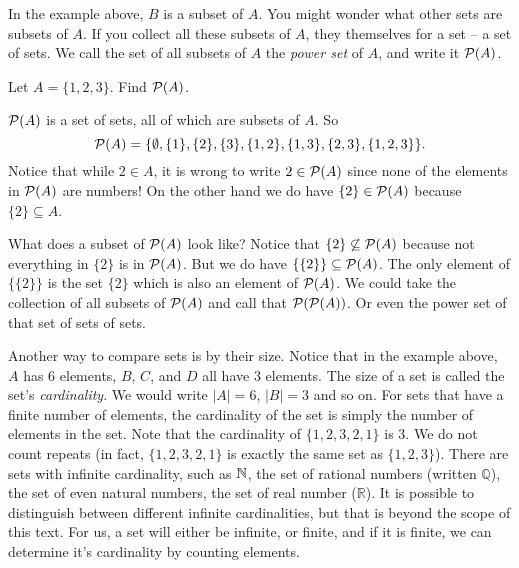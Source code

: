 \documentclass[12pt]{article}
\begin{document}
In the example above, $B$ is a subset of $A$.  You might wonder what other sets are subsets of $A$.  If you collect all these subsets of $A$, they themselves for a set -- a set of sets.  We call the set of all subsets of $A$ the \emph{power set} of $A$, and write it $\mathcal P(A)$.

\begin{example}
  Let $A = \{1,2,3\}$.  Find $\mathcal P(A)$.
  \begin{solution}
    $\mathcal P(A)$ is a set of sets, all of which are subsets of $A$.  So
    \[\mathcal P(A) = \{ \emptyset, \{1\}, \{2\}, \{3\}, \{1,2\}, \{1, 3\}, \{2,3\}, \{1,2,3\}\}.\]
    Notice that while $2 \in A$, it is wrong to write $2 \in \mathcal P(A)$ since none of the elements in $\mathcal P(A)$ are numbers!  On the other hand we do have $\{2\} \in \mathcal P(A)$ because $\{2\} \subseteq A$.

    What does a subset of $\mathcal P(A)$ look like?  Notice that $\{2\} \not\subseteq \mathcal P(A)$ because not everything in $\{2\}$ is in $\mathcal P(A)$.  But we do have $\{ \{2\} \} \subseteq \mathcal P(A)$.  The only element of $\{\{2\}\}$ is the set $\{2\}$ which is also an element of $\mathcal P(A)$.  We could take the collection of all subsets of $\mathcal P(A)$ and call that $\mathcal P(\mathcal P(A))$.  Or even the power set of that set of sets of sets.
  \end{solution}

\end{example}


Another way to compare sets is by their size.  Notice that in the example above, $A$ has 6 elements, $B$, $C$, and $D$ all have 3 elements.  The size of a set is called the set's \emph{cardinality}.  We would write $|A| = 6$, $|B| = 3$ and so on.  For sets that have a finite number of elements, the cardinality of the set is simply the number of elements in the set.  Note that the cardinality of $\{ 1, 2, 3, 2, 1\}$ is 3. We do not count repeats (in fact, $\{1, 2, 3, 2, 1\}$ is exactly the same set as $\{1, 2, 3\}$).  There are sets with infinite cardinality, such as $\mathbb N$, the set of rational numbers (written $\mathbb Q$), the set of even natural numbers, the set of real number ($\mathbb R$).  It is possible to distinguish between different infinite cardinalities, but that is beyond the scope of this text.  For us, a set will either be infinite, or finite, and if it is finite, we can determine it's cardinality by counting elements.
\end{document}
